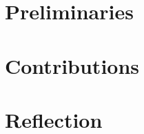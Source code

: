 \documentclass[11pt]{report}
\begin{document}



\tableofcontents
\listoffigures

\newpage


\part{Preliminaries}


\part{Contributions}




\part{Reflection}




\end{document}
